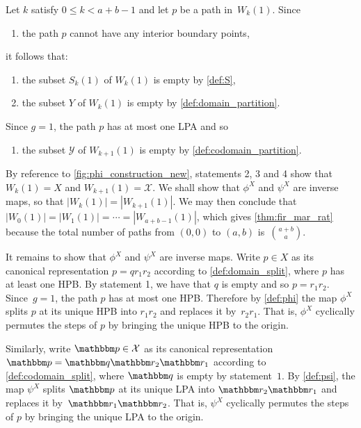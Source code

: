 \documentclass[11pt]{article}
\theoremstyle{definition} %
\numberwithin{equation}{section}
\begin{document}
Let $k$ satisfy $0\le k < a+b-1$ and let $p$ be a path in~$W_k(1)$. Since
\begin{enumerate}
    \item 
    the path $p$ cannot have any interior boundary points,
\end{enumerate}
it follows that:
\begin{enumerate}
    \item[2.]
    the subset $S_k(1)$ of $W_k(1)$ is empty by \cref{def:S}, 

    \item[3.]
    the subset $Y$ of  $ W_k(1)$ is empty by \cref{def:domain_partition}.
\end{enumerate}

Since $g=1$, the path $p$ has at most one LPA and so
\begin{enumerate}
    \item[4.]
    the subset $\mathcal Y$ of $ W_{k+1}(1)$ is empty by \cref{def:codomain_partition}.
\end{enumerate}
By reference to \cref{fig:phi_construction_new}, statements 2, 3 and 4 show that $W_k(1) = X$ and $W_{k+1}(1) = \mathcal{X}$.
We shall show that $\phi^X$ and $\psi^X$ are inverse maps, so that $|W_k(1)| = |W_{k+1}(1)|$. We may then conclude that $|W_0(1)| = |W_1(1)| = \cdots = |W_{a+b-1}(1)|$, which gives \cref{thm:fir_mar_rat} because the total number of paths from $(0,0)$ to $(a,b)$ is~$\binom{a+b}{a}$.

It remains to show that $\phi^X$ and $\psi^X$ are inverse maps. Write $p \in X$ as its canonical representation $p=qr_1r_2$ according to \cref{def:domain_split}, where $p$ has at least one HPB. 
By statement 1, we have that $q$ is empty and so $p=r_1r_2$. Since~$g=1$, the path $p$ has at most one HPB.
Therefore by \cref{def:phi} the map $\phi^X$ splits $p$ at its unique HPB into $r_1r_2$ and replaces it by~$r_2r_1$. That is, $\phi^X$  cyclically permutes the steps of $p$ by bringing the unique HPB to the origin.

Similarly, write $\mathbbm p \in \mathcal X$ as its canonical representation $\mathbbm p = \mathbbm q \mathbbm r_2 \mathbbm r_1$ according to \cref{def:codomain_split}, where $\mathbbm q$ is empty by statement~$1$. %
By \cref{def:psi}, the map $\psi^X$ splits $\mathbbm p$ at its unique LPA into $\mathbbm r_2 \mathbbm r_1$ and replaces it by~$\mathbbm r_1 \mathbbm r_2$. That is, $\psi^X$  cyclically permutes the steps of $p$ by bringing the unique LPA to the origin. 
\end{document}
